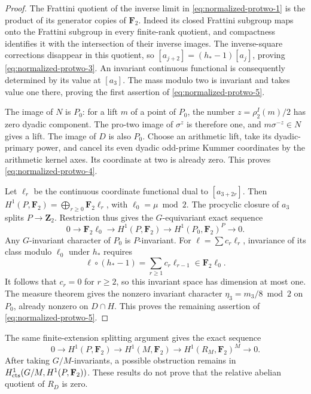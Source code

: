 \begin{proof}
The Frattini quotient of the inverse limit in \eqref{eq:normalized-protwo-1} is the product
of its generator copies of \(\mathbf F_2\).
Indeed its closed Frattini subgroup maps onto the Frattini
subgroup in every finite-rank quotient, and compactness
identifies it with the intersection of their inverse images.
The inverse-square corrections disappear in this quotient,
so
\([a_{j+2}]=(h_*-1)[a_j]\), proving \eqref{eq:normalized-protwo-3}.
An invariant continuous functional is consequently determined
by its value at \([a_3]\).
The mass modulo two is invariant and takes value one there,
proving the first assertion of \eqref{eq:normalized-protwo-5}.

The image of \(N\) is \(P_0\): for a lift \(m\) of a point of
\(P_0\), the number \(z=\rho_2^I(m)/2\) has zero dyadic
component. The pro-two image of \(\sigma^z\) is therefore one,
and \(m\sigma^{-z}\in N\) gives a lift.
The image of \(D\) is also \(P_0\).
Choose an arithmetic lift, take its dyadic-primary power, and
cancel its even dyadic odd-prime Kummer coordinates by the
arithmetic kernel axes. Its coordinate at two is already zero.
This proves \eqref{eq:normalized-protwo-4}.

Let \(\ell_r\) be the continuous coordinate functional dual to
\([a_{3+2r}]\). Then
\(H^1(P,\mathbf F_2)=\bigoplus_{r\ge0}\mathbf F_2\ell_r\),
with \(\ell_0=\mu\bmod2\).
The procyclic closure of \(a_3\) splits \(P\to\mathbf Z_2\).
Restriction thus gives the \(G\)-equivariant exact sequence
\[
 0\longrightarrow\mathbf F_2\ell_0
 \longrightarrow H^1(P,\mathbf F_2)
 \longrightarrow H^1(P_0,\mathbf F_2)^P
 \longrightarrow0.
\]
Any \(G\)-invariant character of \(P_0\) is \(P\)-invariant.
For \(\ell=\sum c_r\ell_r\), invariance of its class modulo
\(\ell_0\) under \(h_*\) requires
\[
 \ell\circ(h_*-1)=\sum_{r\ge1}c_r\ell_{r-1}
                   \in\mathbf F_2\ell_0.
\]
It follows that \(c_r=0\) for \(r\ge2\), so this invariant
space has dimension at most one.
The measure theorem gives the nonzero invariant character
\(\eta_3=m_3/8\bmod2\) on \(P_0\), already nonzero on
\(D\cap H\). This proves the remaining assertion of \eqref{eq:normalized-protwo-5}.
\end{proof}

\begin{remark}
The same finite-extension splitting argument gives the exact
sequence
\[
 0\longrightarrow H^1(P,\mathbf F_2)
 \longrightarrow H^1(M,\mathbf F_2)
 \longrightarrow H^1(R_M,\mathbf F_2)^M
 \longrightarrow0.
\]
After taking \(G/M\)-invariants, a possible obstruction remains
in \(H^1_{\rm cts}(G/M,H^1(P,\mathbf F_2))\).
These results do not prove that the relative abelian quotient
of \(R_D\) is zero.
\end{remark}
